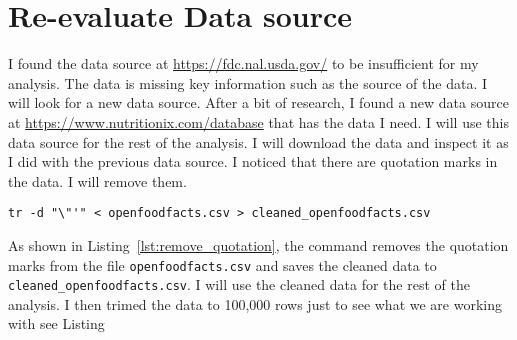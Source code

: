 \section{Re-evaluate Data source}

I found the data source at \url{https://fdc.nal.usda.gov/} to be insufficient for my analysis. The data is missing key information such as the source of the data. I will look for a new data source. After a bit of research, I found a new data source at \url{https://www.nutritionix.com/database} that has the data I need. I will use this data source for the rest of the analysis. I will download the data and inspect it as I did with the previous data source. I noticed that there are quotation marks in the data. I will remove them.

\begin{lstlisting}[style=bashStyle, caption={Remove Quotation Marks}, label={lst:remove_quotation}]
tr -d "\"'" < openfoodfacts.csv > cleaned_openfoodfacts.csv
\end{lstlisting}
As shown in Listing~\ref{lst:remove_quotation}, the command removes the quotation marks from the file \texttt{openfoodfacts.csv} and saves the cleaned data to \texttt{cleaned\_openfoodfacts.csv}. I will use the cleaned data for the rest of the analysis. I then trimed the data to 100,000 rows just to see what we are working with see Listing  
